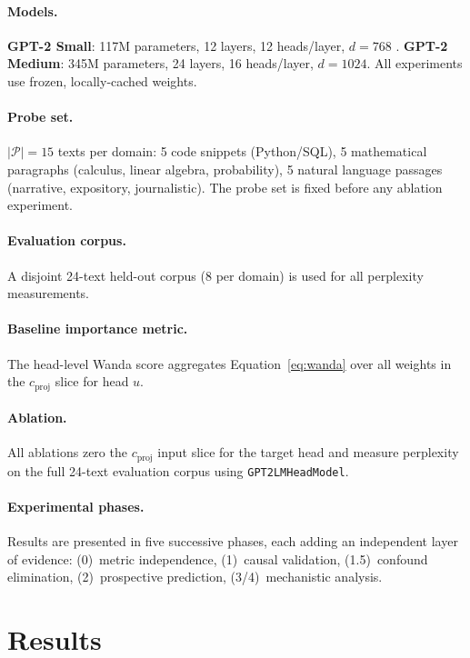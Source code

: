 \documentclass[11pt,a4paper]{article}
\theoremstyle{definition}
\theoremstyle{plain}
\begin{document}
\paragraph{Models.}
\textbf{GPT-2 Small}: 117M parameters, 12 layers, 12 heads/layer,
$d=768$ \citep{radford2019gpt2}.
\textbf{GPT-2 Medium}: 345M parameters, 24 layers, 16 heads/layer,
$d=1024$.
All experiments use frozen, locally-cached weights.

\paragraph{Probe set.}
$|\mathcal{P}|=15$ texts per domain: 5 code snippets (Python/SQL),
5 mathematical paragraphs (calculus, linear algebra, probability), 5
natural language passages (narrative, expository, journalistic).
The probe set is fixed before any ablation experiment.

\paragraph{Evaluation corpus.}
A disjoint 24-text held-out corpus (8 per domain) is used for all
perplexity measurements.

\paragraph{Baseline importance metric.}
The head-level Wanda score aggregates Equation~\eqref{eq:wanda} over all
weights in the $c_{\text{proj}}$ slice for head $u$.

\paragraph{Ablation.}
All ablations zero the $c_{\text{proj}}$ input slice for the target head
and measure perplexity on the full 24-text evaluation corpus using
\texttt{GPT2LMHeadModel}.

\paragraph{Experimental phases.}
Results are presented in five successive phases, each adding an independent
layer of evidence:
(0)~metric independence,
(1)~causal validation,
(1.5)~confound elimination,
(2)~prospective prediction,
(3/4)~mechanistic analysis.

\section{Results}
\label{sec:results}
\end{document}
